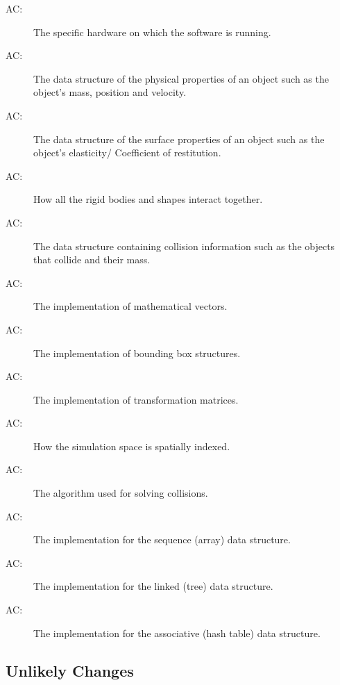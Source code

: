 \documentclass[12pt]{article}
\newcounter{acnum}
\newcommand{\actheacnum}{AC\theacnum}
\begin{document}
\begin{description}
\item[ \actheacnum \label{acHardware}:] The specific
  hardware on which the software is running.
\item[ \actheacnum \label{acBody}:] The data structure of the
physical properties of an object such as the object's mass, position and velocity.
\item[ \actheacnum \label{acShape}:] The data structure of the
surface properties of an object such as the object's elasticity/ Coefficient of restitution.
\item[ \actheacnum \label{acSpace}:] How all the rigid
bodies and shapes interact together.
\item[ \actheacnum \label{acCollision}:] The data structure containing collision information such as the objects that collide and their mass. 
\item[ \actheacnum \label{acVector}:] The implementation of mathematical vectors.
\item[ \actheacnum \label{acBBox}:] The implementation of bounding box structures.
\item[ \actheacnum \label{acTrans}:] The implementation of transformation matrices.
\item[ \actheacnum \label{acSpatialIndex}:] How the simulation space is spatially indexed.
\item[ \actheacnum \label{acSolver}:] The algorithm used for solving collisions.
\item[ \actheacnum \label{acSeqDS}:] The implementation for the sequence (array) data structure.
\item[ \actheacnum \label{acLinkDS}:] The implementation for the linked (tree) data structure.
\item[ \actheacnum \label{acAssocDS}:] The implementation for the associative (hash table) data structure.
\end{description}

\subsection{Unlikely Changes} \label{SecUchange}
\end{document}

